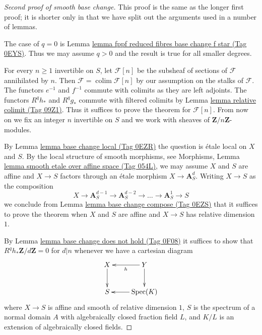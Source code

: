 \documentclass{amsart}
\theoremstyle{plain}
\theoremstyle{definition}
\theoremstyle{remark}
\numberwithin{equation}{subsection}
\def\colim{\mathop{\mathrm{colim}}\nolimits}
\def\Spec{\mathop{\mathrm{Spec}}}
\begin{document}
\begin{proof}[Second proof of smooth base change]
This proof is the same as the longer first proof;
it is shorter only in that we have split out the
arguments used in a number of lemmas.

\medskip\noindent
The case of $q = 0$ is
Lemma \href{https://stacks.math.columbia.edu/tag/0EYS}{lemma fppf reduced fibres base change f star (Tag 0EYS)}.
Thus we may assume $q > 0$ and the result is true
for all smaller degrees.

\medskip\noindent
For every $n \geq 1$ invertible on $S$, let $\mathcal{F}[n]$
be the subsheaf of sections of $\mathcal{F}$ annihilated by $n$. Then
$\mathcal{F} = \colim \mathcal{F}[n]$ by our assumption on
the stalks of $\mathcal{F}$. The functors $e^{-1}$ and $f^{-1}$
commute with colimits as they are left adjoints. The functors
$R^qh_*$ and $R^qg_*$ commute with filtered colimits by
Lemma \href{https://stacks.math.columbia.edu/tag/09Z1}{lemma relative colimit (Tag 09Z1)}.
Thus it suffices to prove the theorem for $\mathcal{F}[n]$.
From now on we fix an integer $n$ invertible on $S$ and we work with
sheaves of $\mathbf{Z}/n\mathbf{Z}$-modules.

\medskip\noindent
By Lemma \href{https://stacks.math.columbia.edu/tag/0EZR}{lemma base change local (Tag 0EZR)} the question is \'etale local
on $X$ and $S$. By the local structure of smooth morphisms, see
Morphisms, Lemma \href{https://stacks.math.columbia.edu/tag/054L}{lemma smooth etale over affine space (Tag 054L)},
we may assume $X$ and $S$ are affine and $X \to S$
factors through an \'etale morphism $X \to \mathbf{A}^d_S$.
Writing $X \to S$ as the composition
$$
X \to \mathbf{A}^{d - 1}_S \to \mathbf{A}^{d - 2}_S \to \ldots \to
\mathbf{A}^1_S \to S
$$
we conclude from Lemma \href{https://stacks.math.columbia.edu/tag/0EZS}{lemma base change compose (Tag 0EZS)}
that it suffices to prove the theorem when $X$ and $S$
are affine and $X \to S$ has relative dimension $1$.

\medskip\noindent
By Lemma \href{https://stacks.math.columbia.edu/tag/0F08}{lemma base change does not hold (Tag 0F08)} it suffices to show that
$R^qh_*\mathbf{Z}/d\mathbf{Z} = 0$ for $d | n$ whenever we have a
cartesian diagram
$$
\xymatrix{
X \ar[d] & Y \ar[d] \ar[l]^h \\
S & \Spec(K) \ar[l]
}
$$
where $X \to S$ is affine and smooth of relative dimension $1$,
$S$ is the spectrum of a normal
domain $A$ with algebraically closed fraction field $L$,
and $K/L$ is an extension of algebraically closed fields.


\end{proof}
\end{document}
